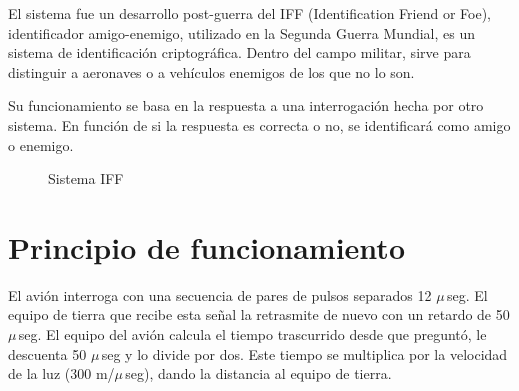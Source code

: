El sistema fue un desarrollo post-guerra del IFF (Identification Friend or Foe), identificador amigo-enemigo, utilizado en la Segunda Guerra Mundial, es un sistema de identificaci\'on criptogr\'afica. Dentro del campo militar, sirve para distinguir a aeronaves o a veh\'iculos enemigos de los que no lo son.

Su funcionamiento se basa en la respuesta a una interrogaci\'on hecha por otro sistema. En funci\'on de si la respuesta es correcta o no, se identificar\'a como amigo o enemigo.

\begin{figure}[!htb]
  \centering

  \caption{Sistema IFF}
  \label{fig:DME.sistema.iff}
\end{figure}


\section{Principio de funcionamiento}
\label{sec:DME.principio.funcionamiento}

El avi\'on interroga con una secuencia de pares de pulsos separados 12 $\mu$\,seg. El equipo de tierra que recibe esta se\~nal la retrasmite de nuevo con un retardo de 50 $\mu$\,seg. El equipo del avi\'on calcula el tiempo trascurrido desde que pregunt\'o, le descuenta 50 $\mu$\,seg y lo divide por dos. Este tiempo se multiplica por la velocidad de la luz (300 m/$\mu$\,seg), dando la distancia al equipo de tierra.

